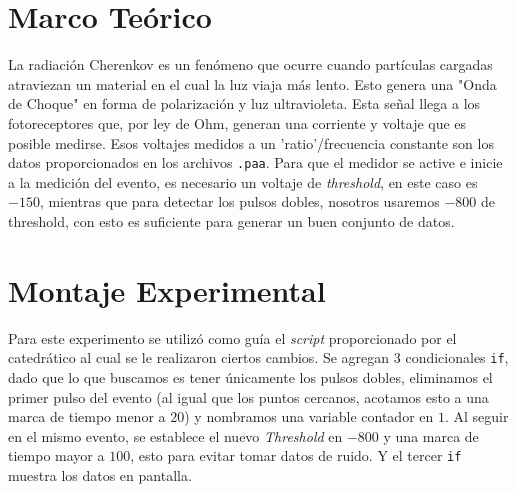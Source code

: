 \documentclass[conference]{IEEEtran}
\begin{document}
\section{Marco Teórico}
    La radiación Cherenkov es un fenómeno que ocurre cuando partículas cargadas atraviezan un material en el cual la luz viaja más lento. Esto genera una "Onda de Choque" en forma de polarización y luz ultravioleta. Esta señal llega a los fotoreceptores que, por ley de Ohm, generan una corriente y voltaje que es posible medirse. Esos voltajes medidos a un 'ratio'/frecuencia constante son los datos proporcionados en los archivos \texttt{.paa}. Para que el medidor se active e inicie a la medición del evento, es necesario un voltaje de \textit{threshold}, en este caso es $-150$, mientras que para detectar los pulsos dobles, nosotros usaremos $-800$ de threshold, con esto es suficiente para generar un buen conjunto de datos.
    



\section{Montaje Experimental}
%

Para este experimento se utilizó como guía el \textit{script} proporcionado por el catedrático al cual se le realizaron ciertos cambios. Se agregan 3 condicionales \texttt{if}, dado que lo que buscamos es tener únicamente los pulsos dobles, eliminamos el primer pulso del evento (al igual que los puntos cercanos, acotamos esto a una marca de tiempo menor a $20$) y nombramos una variable contador en $1$. Al seguir en el mismo evento, se establece el nuevo \textit{Threshold} en $-800$ y una marca de tiempo mayor a $100$, esto para evitar tomar datos de ruido. Y el tercer \texttt{if} muestra los datos en pantalla. \\
\end{document}
